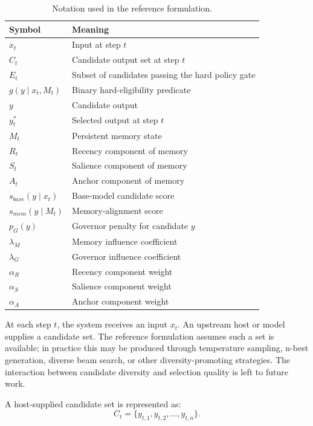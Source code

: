 \documentclass[11pt]{article}
\begin{document}
\begin{table}[ht]
\centering
\begin{tabular}{ll}
\toprule
Symbol & Meaning \\
\midrule
$x_t$ & Input at step $t$ \\
$C_t$ & Candidate output set at step $t$ \\
$E_t$ & Subset of candidates passing the hard policy gate \\
$g(y\mid x_t,M_t)$ & Binary hard-eligibility predicate \\
$y$ & Candidate output \\
$y_t^*$ & Selected output at step $t$ \\
$M_t$ & Persistent memory state \\
$R_t$ & Recency component of memory \\
$S_t$ & Salience component of memory \\
$A_t$ & Anchor component of memory \\
$s_{base}(y \mid x_t)$ & Base-model candidate score \\
$s_{mem}(y \mid M_t)$ & Memory-alignment score \\
$p_G(y)$ & Governor penalty for candidate $y$ \\
$\lambda_M$ & Memory influence coefficient \\
$\lambda_G$ & Governor influence coefficient \\
$\alpha_R$ & Recency component weight \\
$\alpha_S$ & Salience component weight \\
$\alpha_A$ & Anchor component weight \\
\bottomrule
\end{tabular}
\caption{Notation used in the reference formulation.}
\label{tab:notation}
\end{table}


At each step $t$, the system receives an input $x_t$. An upstream host or model supplies a candidate set. The reference formulation assumes such a set is available; in practice this may be produced through temperature sampling, n-best generation, diverse beam search, or other diversity-promoting strategies. The interaction between candidate diversity and selection quality is left to future work.

A host-supplied candidate set is represented as:
\begin{equation}
C_t = \{y_{t,1}, y_{t,2}, \ldots, y_{t,n}\}.
\end{equation}
\end{document}
